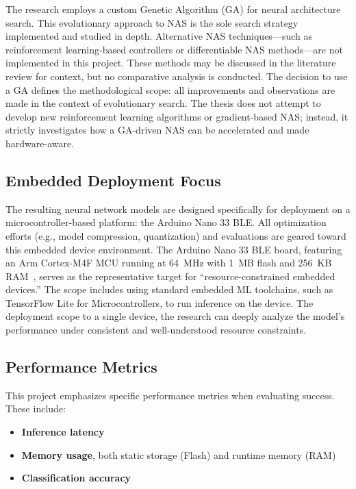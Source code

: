 The research employs a custom Genetic Algorithm (GA) for neural architecture search. This evolutionary approach to NAS is the sole search strategy implemented and studied in depth. Alternative NAS techniques—such as reinforcement learning-based controllers or differentiable NAS methods—are not implemented in this project. These methods may be discussed in the literature review for context, but no comparative analysis is conducted. The decision to use a GA defines the methodological scope: all improvements and observations are made in the context of evolutionary search. The thesis does not attempt to develop new reinforcement learning algorithms or gradient-based NAS; instead, it strictly investigates how a GA-driven NAS can be accelerated and made hardware-aware.

\subsection{Embedded Deployment Focus}

The resulting neural network models are designed specifically for deployment on a microcontroller-based platform: the Arduino Nano 33 BLE. All optimization efforts (e.g., model compression, quantization) and evaluations are geared toward this embedded device environment. The Arduino Nano 33 BLE board, featuring an Arm Cortex-M4F MCU running at 64~MHz with 1~MB flash and 256~KB RAM~\cite{ArduinoNano}, serves as the representative target for “resource-constrained embedded devices.” The scope includes using standard embedded ML toolchains, such as TensorFlow Lite for Microcontrollers, to run inference on the device. Τhe deployment scope to a single device, the research can deeply analyze the model’s performance under consistent and well-understood resource constraints.

\clearpage

\subsection{Performance Metrics}

This project emphasizes specific performance metrics when evaluating success. These include:
\begin{itemize}
    \item \textbf{Inference latency}
    \item \textbf{Memory usage}, both static storage (Flash) and runtime memory (RAM)
    \item \textbf{Classification accuracy}
\end{itemize}

